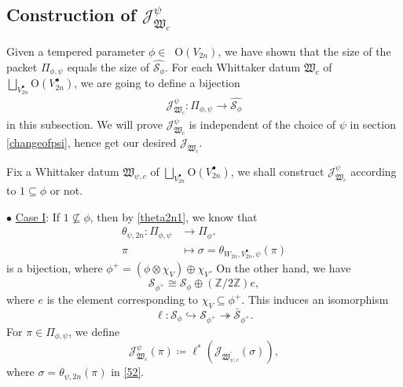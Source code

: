 \documentclass[article]{article}
\numberwithin{equation}{section}
\theoremstyle{definition}
\DeclareMathOperator{\Para}{\Phi_{temp}}
\begin{document}


\subsection{Construction of $\mathcal J^\psi_{\mathfrak W_{c}}$}\label{constructJc}
Given a tempered parameter $\phi \in \Para \mathrm O(V_{2n})$, we have shown that the size of the packet $\Pi_{\phi,\psi}$ equals the size of $\widehat{\mathcal {S}_{\phi}}$. For each Whittaker datum $\mathfrak W_{c}$ of $\bigsqcup_{V_{2n}^{\bullet}}\mathrm O(V_{2n}^\bullet)$, we are going to define a bijection
\begin{align*}
\mathcal J^{\psi}_{\mathfrak W_{c}}: \Pi_{\phi,\psi}\longrightarrow \widehat{\mathcal {S}_{\phi}}
\end{align*} 
in this subsection. We will prove $\mathcal J^{\psi}_{\mathfrak W_{c}}$ is independent of the choice of $\psi$ in section \ref{changeofpsi}, hence get our desired $\mathcal J_{\mathfrak W_{c}}$.
 
Fix a Whittaker datum $\mathfrak W_{\psi,c}$ of $\bigsqcup_{V_{2n}^{\bullet}}\mathrm O(V_{2n}^\bullet)$, we shall construct $\mathcal J^{\psi}_{\mathfrak W_{c}}$ according to $\mathrm{1} \subseteq \phi$ or not. 

$\bullet$ \underline{Case I}: If $\mathrm{1} \nsubseteq \phi$, then by \ref{theta2n1}, we know that   
    \begin{equation}
    \begin{aligned}\label{52}
    \theta_{\psi,2n}: \Pi_{\phi,\psi} &\rightarrow \Pi_{\phi^+}\\
    \pi &\mapsto \sigma= \theta_{W_{2n}, V_{2n}^{\bullet} ,\psi}(\pi)
    \end{aligned}
    \end{equation}
  is a bijection, where $\phi^+=\left(\phi\otimes \chi_{V}\right)\oplus \chi_{V}$. On the other hand, we have  
	$$
	\mathcal S_{\phi^+}\cong \mathcal {S}_{\phi}\oplus (\mathbb Z/2\mathbb Z)e,
	$$
	where $e$ is the element corresponding to $\chi_{V}\subseteq \phi^+$. This induces an isomorphism 
	\begin{equation}\label{55}
	\ell:\mathcal S_{\phi}\hookrightarrow \mathcal S_{\phi^+}\twoheadrightarrow\bar{ \mathcal S}_{\phi^+}. 
	\end{equation}
	For $\pi\in \Pi_{\phi,\psi}$, we define 
	$$
	\mathcal J^{\psi}_{\mathfrak W_{c}}(\pi)\coloneqq  \ell^*(\mathcal J_{\mathfrak W^\prime_{\psi,c}}(\sigma)), 
	$$
	where $\sigma= \theta_{\psi,2n}(\pi)$ in \ref{52}. 
	
\end{document}
